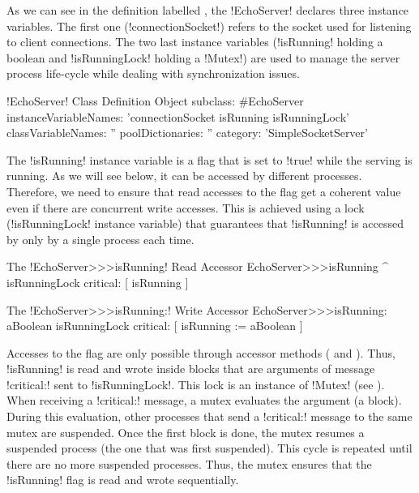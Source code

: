 \documentclass[a4paper,10pt,twoside]{book}
\begin{document}
As we can see in the definition labelled , the \ct!EchoServer! declares three instance variables.
The first one (\ct!connectionSocket!) refers to the socket used for listening to client connections.
The two last instance variables (\ct!isRunning! holding a boolean and \ct!isRunningLock! holding a \ct!Mutex!) are used to manage the server process life-cycle while dealing with synchronization issues. 
 
\begin{classdef}[echoServerClassDef]{\ct!EchoServer! Class Definition}
Object subclass: #EchoServer
	instanceVariableNames: 'connectionSocket isRunning isRunningLock'
	classVariableNames: ''
	poolDictionaries: ''
	category: 'SimpleSocketServer'
\end{classdef}


The \ct!isRunning! instance variable is a flag that is set to \ct!true! while the serving is running.
As we will see below, it can be accessed by different processes.
Therefore, we need to ensure that read accesses to the flag get a coherent value even if there are concurrent write accesses.
This is achieved using a lock (\ct!isRunningLock! instance variable) that guarantees that \ct!isRunning! is accessed by only by a single process each time.

\begin{method}{The \ct!EchoServer>>>isRunning! Read Accessor}
EchoServer>>>isRunning
	^ isRunningLock critical: [ isRunning ]
\end{method}

\begin{method}{The \ct!EchoServer>>>isRunning:! Write Accessor}
EchoServer>>>isRunning: aBoolean
	isRunningLock critical: [ isRunning := aBoolean ]
\end{method}

Accesses to the flag are only possible through accessor methods ( and ).
Thus, \ct!isRunning! is read and wrote inside blocks that are arguments of message \ct!critical:! sent to \ct!isRunningLock!.
This lock is an instance of \ct!Mutex! (see ).
When receiving a \ct!critical:! message, a mutex evaluates the argument (a block).
During this evaluation, other processes that send a \ct!critical:! message to the same mutex are suspended.
Once the first block is done, the mutex resumes a suspended process (the one that was first suspended).
This cycle is repeated until there are no more suspended processes.
Thus, the mutex ensures that the \ct!isRunning! flag is read and wrote sequentially.
\end{document}
